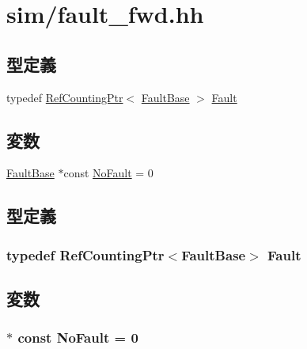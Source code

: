 \hypertarget{fault__fwd_8hh}{
\section{sim/fault\_\-fwd.hh}
\label{fault__fwd_8hh}
}
\subsection*{型定義}
\begin{DoxyCompactItemize}
\item 
typedef \hyperlink{classRefCountingPtr}{RefCountingPtr}$<$ \hyperlink{classFaultBase}{FaultBase} $>$ \hyperlink{fault__fwd_8hh_a79b31ca450eaa665c335a928cb98b834}{Fault}
\end{DoxyCompactItemize}
\subsection*{変数}
\begin{DoxyCompactItemize}
\item 
\hyperlink{classFaultBase}{FaultBase} $\ast$const \hyperlink{fault__fwd_8hh_ab8ce3b69a6737f63fcdcf99910feb153}{NoFault} = 0
\end{DoxyCompactItemize}


\subsection{型定義}
\hypertarget{fault__fwd_8hh_a79b31ca450eaa665c335a928cb98b834}{
\subsubsection[{Fault}]{\setlength{\rightskip}{0pt plus 5cm}typedef {\bf RefCountingPtr}$<${\bf FaultBase}$>$ {\bf Fault}}}
\label{fault__fwd_8hh_a79b31ca450eaa665c335a928cb98b834}


\subsection{変数}
\hypertarget{fault__fwd_8hh_ab8ce3b69a6737f63fcdcf99910feb153}{
\subsubsection[{NoFault}]{$\ast$ const {\bf NoFault} = 0}}
\label{fault__fwd_8hh_ab8ce3b69a6737f63fcdcf99910feb153}
